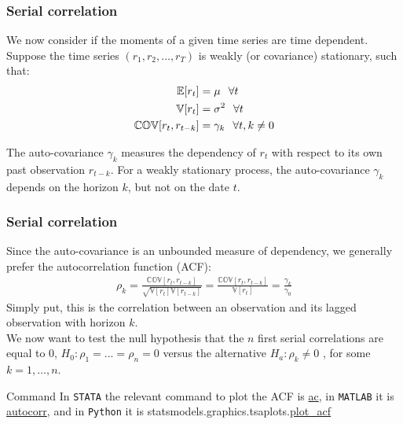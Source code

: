 \documentclass[xcolor=dvipsnames, english, 8pt]{beamer}
\begin{document}
\begin{frame}
    \frametitle{Serial correlation}
    We now consider if the moments of a given time series are time dependent. Suppose the time series $(r_1, r_2,\hdots, r_T )$ is {\color{ubRed}weakly (or covariance) stationary}, such that:
    \begin{align*}
        \mathbb{E}[r_t] &= \mu \hspace{0.25cm} \forall t\\
        \mathbb{V}[r_t] &= \sigma^2 \hspace{0.25cm} \forall t\\
        \mathbb{COV}[r_t,r_{t-k}] &=\gamma_k \hspace{0.25cm} \forall t,k \neq 0
    \end{align*}

    The {\color{ubRed}auto-covariance} $\gamma_k $ measures the dependency of $r_t$ with respect to its own past
    observation $r_{t-k}$. For a weakly stationary process, the auto-covariance $\gamma_k$ depends on the horizon $k$, but
not on the date $t$.
\end{frame}

\begin{frame}
    \frametitle{Serial correlation}
    Since the auto-covariance is an unbounded measure of dependency, we generally prefer the {\color{ubRed}autocorrelation function (ACF)}:
    \begin{align}
        \rho_k = \frac{\mathbb{COV}[r_t,r_{t-k}]}{\sqrt{\mathbb{V}[r_t]\mathbb{V}[r_{t-k}]}} = \frac{\mathbb{COV}[r_t,r_{t-k}]}{\mathbb{V}[r_t]} = \frac{\gamma_k}{\gamma_0}
    \end{align}
    Simply put, this is the correlation between an observation and its lagged observation with horizon $k$. \vspace{0.25cm}\\

    We now want to test the null hypothesis that the $n$ first serial correlations are equal to 0, $H_0 :\rho_1 = ... = \rho_n = 0$ versus the alternative $H_a:  \rho_k \neq 0$ , for some $k = 1, \hdots, n$.\vfill
    
     \begin{exampleblock}{{\small{Command}}}
    In  \texttt{STATA} the relevant command to plot the ACF is \href{https://www.stata.com/manuals13/tscorrgram.pdf}{\color{Purple}ac}, in \texttt{MATLAB} it is \href{https://ch.mathworks.com/help/econ/autocorr.html}{\color{Purple}autocorr}, and in \texttt{Python} it is statsmodels.graphics.tsaplots.\href{https://www.statsmodels.org/dev/generated/statsmodels.graphics.tsaplots.plot_acf.html}{\color{Purple}plot\_acf}
    \end{exampleblock}

\end{frame}
\end{document}

